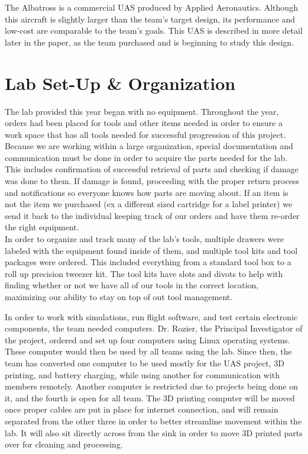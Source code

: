 ﻿\documentclass{article}
\begin{document}
\noindent The Albatross is a commercial UAS produced by Applied Aeronautics. Although this aircraft is slightly larger than the team's target design, its performance and low-cost are comparable to the team's goals. This UAS is described in more detail later in the paper, as the team purchased and is beginning to study this design. \\


\section{Lab Set-Up \& Organization}
\noindent The lab provided this year began with no equipment. Throughout the year, orders had been placed for tools and other items needed in order to ensure a work space that has all tools needed for successful progression of this project. Because we are working within a large organization, special documentation and communication must be done in order to acquire the parts needed for the lab. This includes confirmation of successful retrieval of parts and checking if damage was done to them. If damage is found, proceeding with the proper return process and notifications so everyone knows how parts are moving about. If an item is not the item we purchased (ex a different sized cartridge for a label printer) we send it back to the individual keeping track of our orders and have them re-order the right equipment. \\

\noindent In order to organize and track many of the lab's tools, multiple drawers were labeled with the equipment found inside of them, and multiple tool kits and tool packages were ordered. This included everything from a standard tool box to a roll up precision tweezer kit. The tool kits have slots and divots to help with finding whether or not we have all of our tools in the correct location, maximizing our ability to stay on top of out tool management. 

\noindent In order to work with simulations, run flight software, and test certain electronic components, the team needed computers. Dr. Rozier, the Principal Investigator of the project, ordered and set up four computers using Linux operating systems. These computer would then be used by all teams using the lab. Since then, the team has converted one computer to be used mostly for the UAS project, 3D printing, and battery charging, while using another for communication with members remotely. Another computer is restricted due to projects being done on it, and the fourth is open for all team. The 3D printing computer will be moved once proper cables are put in place for internet connection, and will remain separated from the other three in order to better streamline movement within the lab. It will also sit directly across from the sink in order to move 3D printed parts over for cleaning and processing. \\
\end{document}
